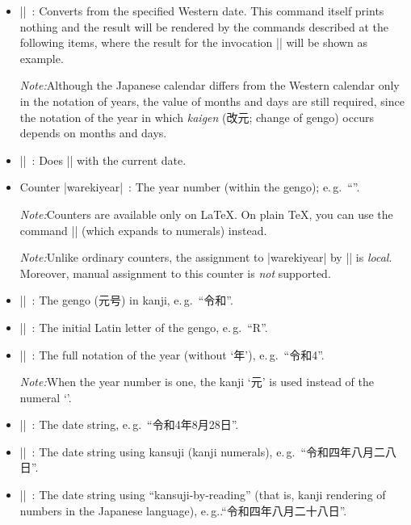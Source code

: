\documentclass[a4paper]{article}
\newcommand{\Meta}[1]{$\langle$\textit{#1}$\rangle$}
\newcommand{\Note}{\par\noindent\emph{Note:}\quad}
\newcommand{\Eg}{e.\,g.}
\newcommand{\Means}{~:\quad}
\newcommand*{\Ja}[1]{{\fIpaex#1}}
\newcommand*{\+}{\hspace{0.25em minus 0.25em}}
\begin{document}
\begin{itemize}
\item |\warekisetdate{|\Meta{year}|}{|\Meta{month}|}{|\Meta{day}|}|\Means
  Converts from the specified Western date.
  This command itself prints nothing
  and the result will be rendered by the commands described
  at the following items, where the result for the invocation
  ||
  will be shown as example.

  \Note Although the Japanese calendar differs from the Western calendar
  only in the notation of years,
  the value of months and days are still required,
  since the notation of the year in which
  \emph{kaigen} (\Ja{改元}; change of gengo)
  occurs depends on months and days.

\item |\warekisettoday|\Means
  Does |\warekisetdate| with the current date.

\item Counter |warekiyear|\Means
  The year number (within the gengo); \Eg~``\Ja{4}''.

  \Note Counters are available only on {\LaTeX}.
  On plain {\TeX}, you can use the command |\thewarekiyear|
  (which expands to numerals) instead.
  \Note Unlike ordinary counters,
  the assignment to |warekiyear| by |\warekisetdate| is \emph{local}.
  Moreover, manual assignment to this counter is \emph{not} supported.

\item |\warekigengo|\Means
  The gengo (\Ja{元号}) in kanji, \Eg~``\Ja{令和}''.

\item |\warekigengoinitial|\Means
  The initial Latin letter of the gengo, \Eg~``\Ja{R}''.

\item |\warekiyear|\Means
  The full notation of the year (without `\Ja{年}'),
  \Eg~``\Ja{令和\+4}''.

  \Note When the year number is one,
  the kanji `\Ja{元}' is used instead of the numeral `\Ja{1}'.

\item |\warekidate|\Means
  The date string, \Eg~``\Ja{令和\+4\+年\+8\+月\+28\+日}''.

\item |\warekikanjidate|\Means
  The date string using kansuji (kanji numerals),
  \Eg~``\Ja{令和四年八月二八日}''.

\item |\warekijkanjidate|\Means
  The date string using ``kansuji-by-reading''
  (that is, kanji rendering of numbers in the Japanese language),
  \Eg.``\Ja{令和四年八月二十八日}''.


\end{itemize}
\end{document}
